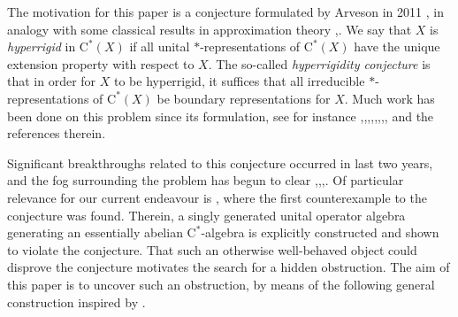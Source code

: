 \documentclass[10pt]{amsart}
\newcommand{\rC}{\mathrm{C}}
\theoremstyle{definition}
\begin{document}
The motivation for this paper is a conjecture formulated by Arveson in 2011 \cite{arveson2011noncommutative}, in analogy with some classical results in approximation theory \cite{korovkin1953convergence},\cite{vsavskin1967mil}.  We say that $X$ is \emph{hyperrigid} in $\rC^*(X)$ if all unital $*$-representations of $\rC^*(X)$ have the unique extension property with respect to $X$. The so-called \emph{hyperrigidity conjecture} is that in order for $X$ to be hyperrigid, it suffices that all irreducible $*$-representations of $\rC^*(X)$ be boundary representations for $X$.  Much work has been done on this problem since its formulation, see for instance \cite{kleski2014korovkin},\cite{kennedy2015essential},\cite{clouatre2018non},\cite{clouatre2018unperforated},\cite{davidson2021choquet},\cite{clouatre2023boundary},\cite{PS2024I},\cite{PS2024II},\cite{PS2024III}  and the references therein.

Significant breakthroughs related to this conjecture occurred in last two years, and the fog surrounding the problem has begun to clear \cite{CTh2024},\cite{scherer2024},\cite{scherer2025},\cite{bilich2025}. Of particular relevance for our current endeavour is \cite{BDO2024}, where the first counterexample to the conjecture was found. Therein, a singly generated unital operator algebra generating an essentially abelian $\rC^*$-algebra is explicitly constructed and shown to violate the conjecture. That such an otherwise well-behaved object could disprove the conjecture motivates the search for a hidden obstruction. The aim of this paper is to uncover such an obstruction, by means of the following general construction inspired by  \cite{BDO2024}.
\end{document}
